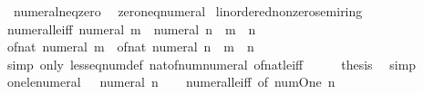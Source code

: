 \begin{isabellebody}
\ \ numeral{\isacharunderscore}{\kern0pt}neq{\isacharunderscore}{\kern0pt}zero\isanewline
\ \ zero{\isacharunderscore}{\kern0pt}neq{\isacharunderscore}{\kern0pt}numeral\isanewline
\isanewline
{}\isamarkupfalse%
%
\isadelimdocument
%
\endisadelimdocument
%
\isatagdocument
%
\isamarkuptrue%
%
\endisatagdocument
{\isafolddocument}%
%
\isadelimdocument
%
\endisadelimdocument
{}\isamarkupfalse%
\ linordered{\isacharunderscore}{\kern0pt}nonzero{\isacharunderscore}{\kern0pt}semiring\isanewline
{}\isanewline
\isanewline
{}\isamarkupfalse%
\ numeral{\isacharunderscore}{\kern0pt}le{\isacharunderscore}{\kern0pt}iff{\isacharcolon}{\kern0pt}\ {\isachardoublequoteopen}numeral\ m\ {\isasymle}\ numeral\ n\ {\isasymlongleftrightarrow}\ m\ {\isasymle}\ n{\isachardoublequoteclose}\isanewline
%
\isadelimproof
%
\endisadelimproof
%
\isatagproof
{}\isamarkupfalse%
\ {\isacharminus}{\kern0pt}\isanewline
\ \ \isamarkupfalse%
\ {\isachardoublequoteopen}of{\isacharunderscore}{\kern0pt}nat\ {\isacharparenleft}{\kern0pt}numeral\ m{\isacharparenright}{\kern0pt}\ {\isasymle}\ of{\isacharunderscore}{\kern0pt}nat\ {\isacharparenleft}{\kern0pt}numeral\ n{\isacharparenright}{\kern0pt}\ {\isasymlongleftrightarrow}\ m\ {\isasymle}\ n{\isachardoublequoteclose}\isanewline
\ \ \ \ \isamarkupfalse%
\ {\isacharparenleft}{\kern0pt}simp\ only{\isacharcolon}{\kern0pt}\ less{\isacharunderscore}{\kern0pt}eq{\isacharunderscore}{\kern0pt}num{\isacharunderscore}{\kern0pt}def\ nat{\isacharunderscore}{\kern0pt}of{\isacharunderscore}{\kern0pt}num{\isacharunderscore}{\kern0pt}numeral\ of{\isacharunderscore}{\kern0pt}nat{\isacharunderscore}{\kern0pt}le{\isacharunderscore}{\kern0pt}iff{\isacharparenright}{\kern0pt}\isanewline
\ \ \isamarkupfalse%
\ \isamarkupfalse%
\ {\isacharquery}{\kern0pt}thesis\ \isamarkupfalse%
\ simp\isanewline
{}\isamarkupfalse%
%
\endisatagproof
{\isafoldproof}%
%
\isadelimproof
\isanewline
%
\endisadelimproof
\isanewline
{}\isamarkupfalse%
\ one{\isacharunderscore}{\kern0pt}le{\isacharunderscore}{\kern0pt}numeral{\isacharcolon}{\kern0pt}\ {\isachardoublequoteopen}{}\ {\isasymle}\ numeral\ n{\isachardoublequoteclose}\isanewline
%
\isadelimproof
\ \ %
\endisadelimproof
%
\isatagproof
{}\isamarkupfalse%
\ numeral{\isacharunderscore}{\kern0pt}le{\isacharunderscore}{\kern0pt}iff\ {\isacharbrackleft}{\kern0pt}of\ num{\isachardot}{\kern0pt}One\ n{\isacharbrackright}{\kern0pt}\ \isamarkupfalse%

\end{isabellebody}
